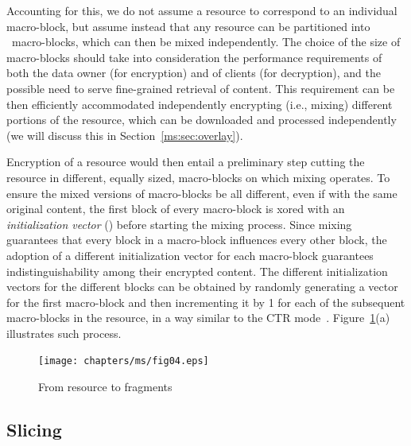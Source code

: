 Accounting for this, we do not assume a resource to correspond to an individual macro-block, but assume instead that any resource can be partitioned into \Mnum\ macro-blocks, which can then be mixed independently. The choice of the size of macro-blocks should take into consideration the performance requirements of both the data owner (for encryption) and of clients (for decryption), and the possible need to serve fine-grained retrieval of content. This requirement can be then efficiently accommodated independently encrypting (i.e., mixing) different portions of the resource, which can be downloaded and processed independently (we will discuss this in Section~\ref{ms:sec:overlay}).

Encryption of a resource would then entail a preliminary step cutting the resource in different, equally sized, macro-blocks on which mixing operates. To ensure the mixed versions of macro-blocks be all different, even if with the same original content, the first block of every macro-block is {\sc xor}ed with an {\em initialization vector\/} () before starting the mixing process. Since mixing guarantees that every block in a macro-block influences every other block, the adoption of a different initialization vector for each macro-block guarantees indistinguishability among their encrypted content. The different initialization vectors for the different blocks can be obtained by randomly generating a vector for the first macro-block and then incrementing it by 1 for each of the subsequent macro-blocks in the resource, in a way similar to the CTR mode~\cite{d01}. Figure~\ref{ms:fig:mixslice}(a) illustrates such process.

\begin{figure}[!t]
{\texttt{[image: chapters/ms/fig04.eps]}}\\
\vspace*{-0.3cm}
\caption{\label{ms:fig:mixslice} From resource to fragments}
\end{figure}

\subsection{Slicing}

